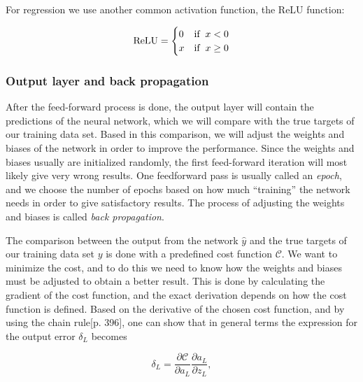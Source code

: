 For regression we use another common activation function, the ReLU
function:

\begin{equation}
\text{ReLU} = \begin{cases}
    0 & \text{if} \hspace{0.2cm} x < 0 \\
    x & \text{if} \hspace{0.2cm} x \geq 0
\end{cases}    
\end{equation}


\hypertarget{output-layer-and-back-propagation}{%
\subsubsection{Output layer and back
propagation}\label{output-layer-and-back-propagation}}

After the feed-forward process is done, the output layer will contain
the predictions of the neural network, which we will compare with the
true targets of our training data set. Based in this comparison, we will
adjust the weights and biases of the network in order to improve the
performance. Since the weights and biases usually are initialized
randomly, the first feed-forward iteration will most likely give very
wrong results. One feedforward pass is usually called an \emph{epoch},
and we choose the number of epochs based on how much ``training'' the
network needs in order to give satisfactory results. The process of
adjusting the weights and biases is called \emph{back propagation}.

The comparison between the output from the network \(\hat{y}\) and the
true targets of our training data set \(y\) is done with a predefined
cost function \(\mathcal{C}\). We want to minimize the cost, and to do
this we need to know how the weights and biases must be adjusted to
obtain a better result. This is done by calculating the gradient of the
cost function, and the exact derivation depends on how the cost function
is defined. Based on the derivative of the chosen cost function, and by using the chain rule\cite{hastie}[p. 396], one can show that in general terms the expression for the output error \(\delta_L\) becomes

\begin{equation}
    \label{eq:outputerror_general}
    \delta_L = \frac{\partial \mathcal{C}}{\partial a_L} \frac{\partial
a_L}{\partial {z_L}},
\end{equation}

